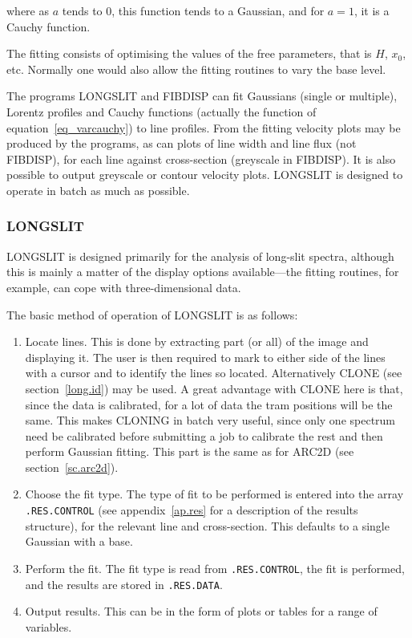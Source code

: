 \documentclass[11pt,twoside]{article}
\newcommand{\xlabel}[1]{}
\begin{document}
where as $a$ tends to 0, this function tends to a Gaussian, and for
$a=1$, it is a Cauchy function.

The fitting consists of optimising the values of the free parameters,
that is $H$, $x_{0}$, etc.  Normally one would also allow the fitting
routines to vary the base level.

The programs LONGSLIT and FIBDISP can fit Gaussians (single or
multiple), Lorentz profiles and Cauchy functions (actually the function
of equation~\ref{eq_varcauchy}) to line profiles. From the fitting
velocity plots may be produced by the programs, as can plots of line
width and line flux (not FIBDISP), for each line against cross-section
(greyscale in FIBDISP).  It is also possible to output greyscale or
contour velocity plots.  LONGSLIT is designed to operate in batch as
much as possible.

\subsubsection{\xlabel{longslit}LONGSLIT}
\label{sec.long}

LONGSLIT is designed primarily for the analysis of long-slit spectra,
although this is mainly a matter of the display options available---the
fitting routines, for example, can cope with three-dimensional data.

The basic method of operation of LONGSLIT is as follows:

\begin{enumerate}

\item Locate lines.  This is done by extracting part (or all) of the
image and displaying it.  The user is then required to mark to either
side of the lines with a cursor and to identify the lines so located.
Alternatively CLONE (see section~\ref{long.id}) may be used.  A great
advantage with CLONE here is that, since the data is calibrated, for a
lot of data the tram positions will be the same.  This makes CLONING in
batch very useful, since only one spectrum need be calibrated before
submitting a job to calibrate the rest and then perform Gaussian
fitting.  This part is the same as for ARC2D (see
section~\ref{sc.arc2d}).

\item Choose the fit type.  The type of fit to be performed is entered
into the array {\tt{.RES.CONTROL}} (see appendix~\ref{ap.res} for a
description of the results structure), for the relevant line and
cross-section.  This defaults to a single Gaussian with a base.

\item Perform the fit.  The fit type is read from {\tt{.RES.CONTROL}}, the fit
is performed, and the results are stored in {\tt{.RES.DATA}}.

\item Output results.  This can be in the form of plots or tables for a
range of variables.

\end{enumerate}
\end{document}
